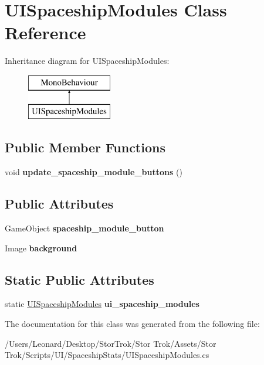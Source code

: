 \hypertarget{class_u_i_spaceship_modules}{}\section{U\+I\+Spaceship\+Modules Class Reference}
\label{class_u_i_spaceship_modules}
Inheritance diagram for U\+I\+Spaceship\+Modules\+:\begin{figure}[H]
\begin{center}
\leavevmode
\includegraphics[height=2.000000cm]{class_u_i_spaceship_modules}
\end{center}
\end{figure}
\subsection*{Public Member Functions}
\begin{DoxyCompactItemize}
\item 
\mbox{\label{class_u_i_spaceship_modules_af9ad6801812d969112449fbea8a2f63f}} 
void {\bfseries update\+\_\+spaceship\+\_\+module\+\_\+buttons} ()
\end{DoxyCompactItemize}
\subsection*{Public Attributes}
\begin{DoxyCompactItemize}
\item 
\mbox{\label{class_u_i_spaceship_modules_a7cbb15ff1f33335c19ea230ccbeb1b7f}} 
Game\+Object {\bfseries spaceship\+\_\+module\+\_\+button}
\item 
\mbox{\label{class_u_i_spaceship_modules_a4949f68b342d7e5327677df886f854ae}} 
Image {\bfseries background}
\end{DoxyCompactItemize}
\subsection*{Static Public Attributes}
\begin{DoxyCompactItemize}
\item 
\mbox{\label{class_u_i_spaceship_modules_a8ec8284b1ab4fa4d309a4a9ed809fc75}} 
static \hyperlink{class_u_i_spaceship_modules}{U\+I\+Spaceship\+Modules} {\bfseries ui\+\_\+spaceship\+\_\+modules}
\end{DoxyCompactItemize}


The documentation for this class was generated from the following file\+:\begin{DoxyCompactItemize}
\item 
/\+Users/\+Leonard/\+Desktop/\+Stor\+Trok/\+Stor Trok/\+Assets/\+Stor Trok/\+Scripts/\+U\+I/\+Spaceship\+Stats/U\+I\+Spaceship\+Modules.\+cs\end{DoxyCompactItemize}
